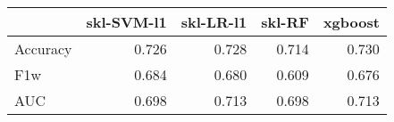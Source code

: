 \begin{tabular}{lrrrr}
\toprule
{} &  skl-SVM-l1 &  skl-LR-l1 &  skl-RF &  xgboost \\
\midrule
Accuracy &       0.726 &      0.728 &   0.714 &    0.730 \\
F1w      &       0.684 &      0.680 &   0.609 &    0.676 \\
AUC      &       0.698 &      0.713 &   0.698 &    0.713 \\
\bottomrule
\end{tabular}
